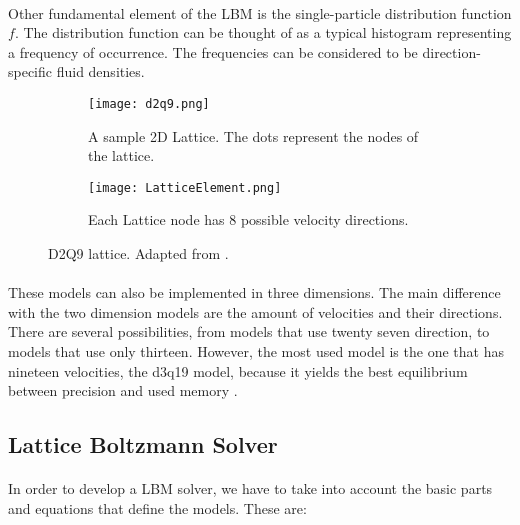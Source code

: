 \paragraph{}Other fundamental element of the LBM is the single-particle distribution function $f$. The distribution function can be thought of as a typical histogram representing a frequency of occurrence. The frequencies can be considered to be direction-specific fluid densities.

\begin{figure}[t]
    \centering
    \begin{subfigure}[t!]{0.45\textwidth}
        \centering
        \texttt{[image: d2q9.png]}
        \caption{A sample 2D Lattice. The dots represent the nodes of the lattice.}
        \label{fig:2Dlattice}
    \end{subfigure}
	\hfill
    \begin{subfigure}[t!]{0.45\textwidth}
        \centering
        \texttt{[image: LatticeElement.png]}
        \caption{Each Lattice node has 8 possible velocity directions. }
        \label{fig:latticeElement}
    \end{subfigure}

    \caption{D2Q9 lattice. Adapted from \citep{sukop2006lattice}.}
    \label{fig:d2q9}
\end{figure}

\paragraph{}These models can also be implemented in three dimensions. The main difference with the two dimension models are the amount of velocities and their directions. There are several possibilities, from models that use twenty seven direction, to models that use only thirteen. However, the most used model is the one that has nineteen velocities, the d3q19 model, because it yields the best equilibrium between precision and used memory \citep{rinaldi2011modelos}. 

\subsection{Lattice Boltzmann Solver}

\paragraph{}In order to develop a LBM solver, we have to take into account the basic parts and equations that define the models. These are:

